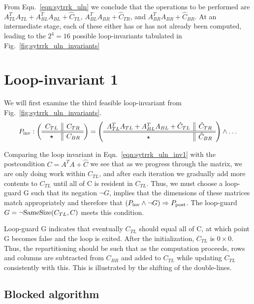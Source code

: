 From Eqn.~\ref{eqn:sytrrk_uln} we conclude that the operations to be performed are
$ A_{TL}^T A_{TL} + A_{BL}^T A_{BL} + \hat{C}_{TL} $,  $ A_{BL}^T A_{BR} + \hat{C}_{TR}$,
and $ A_{BR}^T A_{BR} + \hat{C}_{BR} $. At an intermediate stage, each of these either has or has not already
been computed, leading to the $ 2^4 = 16 $ possible loop-invariants tabulated in Fig.~\ref{fig:sytrrk_uln_invariants}





\section{Loop-invariant 1}
We will first examine the third feasible loop-invariant from Fig.~\ref{fig:sytrrk_uln_invariants}.
\begin{equation}
\label{eqn:sytrrk_uln_inv1}
P_{\rm inv}:
\left( \begin{array}{c || c}  C_{TL}  &  C_{TR}  \\ \hline \hline  \star &  C_{BR}  \end{array} \right)
=
\left( \begin{array}{c || c}  A_{TL}^T A_{TL} + A_{BL}^T A_{BL} + \hat{C}_{TL}  &  \hat{C}_{TR}  \\ \hline \hline  \star  &  \hat{C}_{BR}  \end{array} \right)
\wedge
\ldots
\end{equation}


Comparing the loop invariant in Eqn.~\ref{eqn:sytrrk_uln_inv1} with the postcondition $ C =  A^T A + \hat{C}$
we see that as we progress through the matrix, we are only doing work within $ C_{TL} $, and after each iteration
we gradually add more contents to $ C_{TL} $ until all of C is resident in $C_{TL} $. Thus, we must
choose a loop-guard G such that its negation $\neg{G} $, implies that the dimensions of these matrices
match appropriately and therefore that $ ( P_{\rm inv} \wedge \neg{G} ) \Rightarrow P_{\rm post} $. The loop-guard
$ G = \neg \mbox{SameSize}(C_{TL}, C)  $ meets this condition.

Loop-guard G indicates that eventually $C_{TL}$ should equal all of C, at which point G becomes false
and the loop is exited. After the initialization, $C_{TL}$ is $ 0 \times 0 $.  Thus, the repartitioning should be
such that as the computation proceeds, rows and columns are subtracted from $C_{BR}$ and added to $C_{TL}$
while updating $C_{TL}$ consistently with this. This is illustrated by the shifting of the double-lines.

\subsection{Blocked algorithm}

